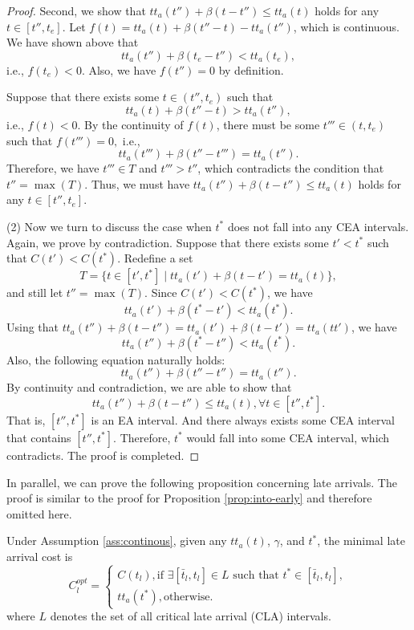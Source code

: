 \begin{proof}
Second,  we show that $ tt_a(t'')  + \beta (t - t'' ) \le  tt_a(t )$ holds for any $ t \in [t'',  t_e]$.  Let $ f(t)= tt_a(t)  + \beta (t'' - t ) -  tt_a(t'' ) $, which is continuous.  We have shown above that $$tt_a(t'')  + \beta (t_e - t'' ) <  tt_a(t_e),$$
i.e., $f(t_e) <0$. Also, we have $f(t'') =0$ by definition. 

Suppose that there exists some $t \in (t'',  t_e)$ such that $$tt_a(t)  + \beta (t'' - t ) >  tt_a(t'' ),$$ i.e., $f(t) <0$. By the continuity of $f(t)$, there must be some $t''' \in (t, t_e)$ such that $f(t''')=0,$ i.e., $$tt_a(t''')  + \beta (t'' - t''' ) =  tt_a(t'' ).$$
Therefore, we have $t''' \in T$ and $t''' > t''$, which contradicts the condition that $t'' =\max(T)$. Thus, we must have $ tt_a(t'')  + \beta (t - t'' ) \le  tt_a(t )$ holds for any $ t \in [t'',  t_e]$. 

(2) Now we turn to discuss the case when $t^*$ does not fall into any CEA intervals. Again, we prove by contradiction. Suppose that there exists some $t' < t^*$ such that $C(t') < C(t^*)$. Redefine a set 
\begin{equation}\label{eq:def_T_2}
    T = \{t \in [t', t^*] \mid tt_a(t')  + \beta (t - t' ) =  tt_a(t )\}, 
\end{equation} 
and still let $t'' = \max(T)$. Since $C(t') < C(t^*)$, we have 
$$tt_a(t') + \beta (t^* - t') < tt_a(t^*).$$
Using that $tt_a(t'')  + \beta (t - t'' )  = tt_a(t')  + \beta (t - t' )  = tt_a(tt') $, we have 
$$tt_a(t'') + \beta (t^* - t'') < tt_a(t^*).$$
Also, the following equation naturally holds: 
$$tt_a(t'') + \beta (t'' - t'') = tt_a(t'').$$
By continuity and contradiction,  we are able to show that $$tt_a(t'') + \beta (t - t'') \le tt_a(t), \forall t \in [t'', t^*].$$
That is, $[t'', t^*] $ is an EA interval. And there always exists some CEA interval that contains $[t'', t^*]$. Therefore, $t^*$ would fall into some CEA interval, which contradicts.  The proof is completed.  


\end{proof}

In parallel, we can prove the following proposition concerning late arrivals. The proof is similar to the proof for Proposition \ref{prop:into-early} and therefore omitted here. 


\begin{prop}
  \label{prop:into-late}
 Under Assumption \ref{ass:continous}, given any $tt_a(t)$, $\gamma$, and $t^*$, the minimal late arrival cost is  
$$C_l^{opt} = \begin{cases}
    C(t_l),  \text{if }\exists [\bar{t}_l, t_l] \in L \text{ such that } t^* \in [\bar{t}_l, t_l],\\
     tt_a(t^*), \text{otherwise}. 
\end{cases}$$
where $L$ denotes the set of all critical late arrival (CLA) intervals.
\end{prop}


